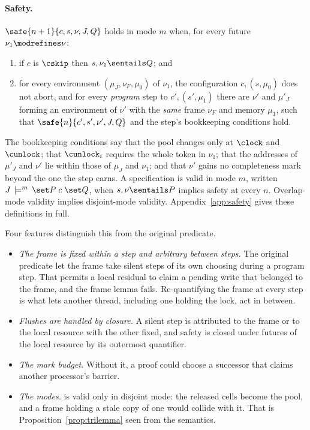 \paragraph{Safety.}
$\safe{n+1}{c,s,\nu,J,Q}$ holds in mode $m$ when, for every future
$\nu_1 \modrefines \nu$:
\begin{enumerate}[nosep]
  \item if $c$ is $\cskip$ then $s,\nu_1 \sentails Q$; and
  \item for every environment $(\mu_J,\nu_F,\mu_0)$ of $\nu_1$, the
        configuration $c,(s,\mu_0)$ does not abort, and for every
        \emph{program} step to $c',(s',\mu_1)$ there are $\nu'$ and
        $\mu'_J$ forming an environment of $\nu'$ with the \emph{same}
        frame $\nu_F$ and memory $\mu_1$, such that $\safe{n}{c',s',\nu',J,Q}$
        and the step's bookkeeping conditions hold.
\end{enumerate}
The bookkeeping conditions say that the pool changes only at $\clock$ and
$\cunlock$; that $\cunlock_i$ requires the whole token in $\nu_1$; that the
addresses of $\mu'_J$ and $\nu'$ lie within those of $\mu_J$ and $\nu_1$;
and that $\nu'$ gains no completeness mark beyond the one the step earns.
A specification is valid in mode $m$, written $\mtruespec{J}{m}{P}{c}{Q}$,
when $s,\nu \sentails P$ implies safety at every $n$. Overlap-mode validity
implies disjoint-mode validity. Appendix~\ref{app:safety} gives these
definitions in full.

Four features distinguish this from the original predicate.
\begin{itemize}[nosep]
  \item \emph{The frame is fixed within a step and arbitrary between
        steps.} The original predicate let the frame take silent steps of
        its own choosing during a program step. That permits a local
        residual to claim a pending write that belonged to the frame, and
        the frame lemma fails.
        Re-quantifying the frame at every step is what lets another
        thread, including one holding the lock, act in between.
  \item \emph{Flushes are handled by closure.} A silent step is attributed
        to the frame or to the local resource with the other fixed, and safety is closed
        under futures of the local resource by its outermost quantifier.
  \item \emph{The mark budget.} Without it, a proof could choose a
        successor that claims another processor's barrier.
  \item \emph{The modes.}  is valid only in disjoint mode: the
        released cells become the pool, and a frame holding a stale copy of
        one would collide with it. That is Proposition~\ref{prop:trilemma}
        seen from the semantics.
\end{itemize}

